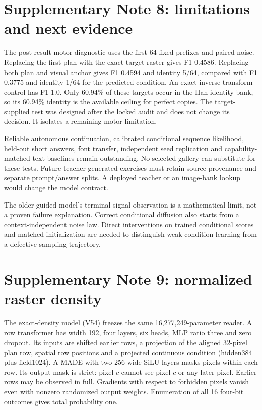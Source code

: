 \documentclass[10pt,a4paper]{article}
\begin{document}
\section*{Supplementary Note 8: limitations and next evidence}
The post-result motor diagnostic uses the first 64 fixed prefixes and paired
noise. Replacing the first plan with the exact target raster gives F1 0.4586.
Replacing both plan and visual anchor gives F1 0.4594 and identity 5/64,
compared with F1 0.3775 and identity 1/64 for the predicted condition. An exact
inverse-transform control has F1 1.0. Only 60.94\% of these targets occur in
the Han identity bank, so its 60.94\% identity is the available ceiling for
perfect copies. The target-supplied test was designed after the locked audit
and does not change its decision. It isolates a remaining motor limitation.

Reliable autonomous continuation, calibrated conditional sequence likelihood,
held-out short answers, font transfer, independent seed replication and
capability-matched text baselines remain outstanding. No selected gallery can
substitute for these tests. Future teacher-generated exercises must retain
source provenance and separate prompt/answer splits. A deployed teacher or
an image-bank lookup would change the model contract.

The older guided model's terminal-signal observation is a mathematical limit,
not a proven failure explanation. Correct conditional diffusion also starts
from a context-independent noise law. Direct interventions on trained
conditional scores and matched initialization are needed to distinguish weak
condition learning from a defective sampling trajectory.

\section*{Supplementary Note 9: normalized raster density}
The exact-density model (V54) freezes the same 16,277,249-parameter reader.
A row transformer has width 192, four layers, six heads, MLP ratio three and
zero dropout. Its inputs are shifted earlier rows, a projection of the aligned
32-pixel plan row, spatial row positions and a projected continuous condition
(hidden384 plus field1024). A MADE with two 256-wide SiLU layers masks pixels
within each row. Its output mask is strict: pixel $c$ cannot see pixel $c$ or
any later pixel. Earlier rows may be observed in full. Gradients with respect
to forbidden pixels vanish even with nonzero randomized output weights.
Enumeration of all 16 four-bit outcomes gives total probability one.
\end{document}
